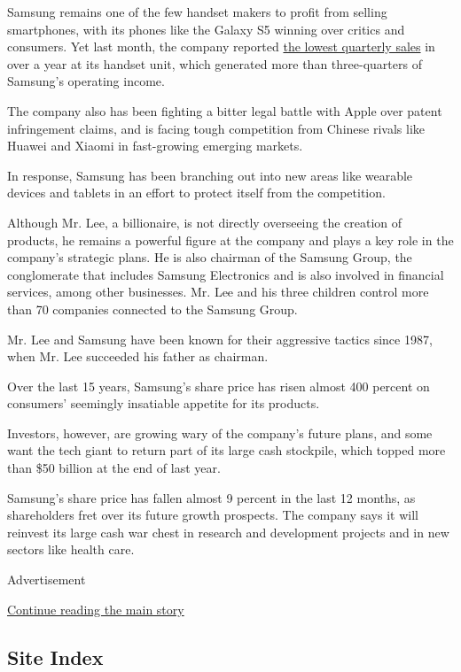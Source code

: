 Samsung remains one of the few handset makers to profit from selling
smartphones, with its phones like the Galaxy S5 winning over critics and
consumers. Yet last month, the company reported
\href{http://www.nytimes.com/2014/04/09/business/international/samsung-electronics-hit-by-earnings-decline-as-smartphone-sales-slow.html?_r=0}{the
lowest quarterly sales} in over a year at its handset unit, which
generated more than three-quarters of Samsung's operating income.

The company also has been fighting a bitter legal battle with Apple over
patent infringement claims, and is facing tough competition from Chinese
rivals like Huawei and Xiaomi in fast-growing emerging markets.

In response, Samsung has been branching out into new areas like wearable
devices and tablets in an effort to protect itself from the competition.

Although Mr. Lee, a billionaire, is not directly overseeing the creation
of products, he remains a powerful figure at the company and plays a key
role in the company's strategic plans. He is also chairman of the
Samsung Group, the conglomerate that includes Samsung Electronics and is
also involved in financial services, among other businesses. Mr. Lee and
his three children control more than 70 companies connected to the
Samsung Group.

Mr. Lee and Samsung have been known for their aggressive tactics since
1987, when Mr. Lee succeeded his father as chairman.

Over the last 15 years, Samsung's share price has risen almost 400
percent on consumers' seemingly insatiable appetite for its products.

Investors, however, are growing wary of the company's future plans, and
some want the tech giant to return part of its large cash stockpile,
which topped more than \$50 billion at the end of last year.

Samsung's share price has fallen almost 9 percent in the last 12 months,
as shareholders fret over its future growth prospects. The company says
it will reinvest its large cash war chest in research and development
projects and in new sectors like health care.

Advertisement

\protect\hyperlink{after-bottom}{Continue reading the main story}

\hypertarget{site-index}{%
\subsection{Site Index}\label{site-index}}

